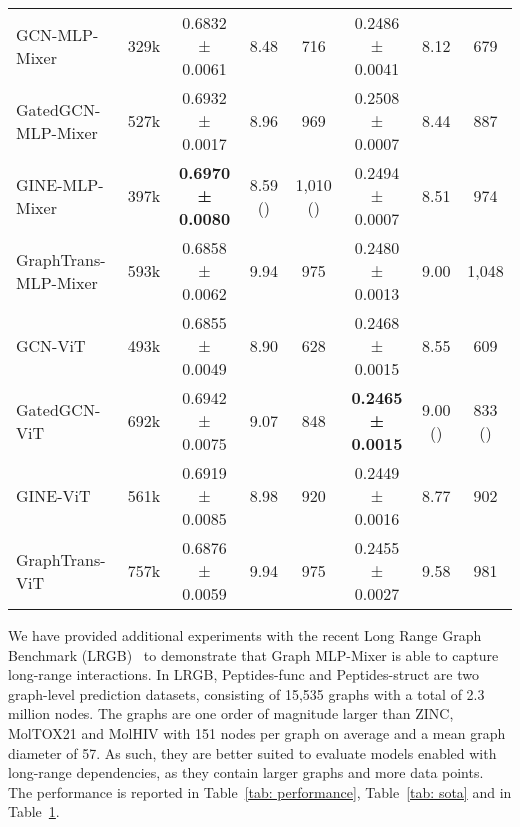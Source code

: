 \documentclass{article}
\begin{document}
\begin{table}[!ht]
\begin{tabular}{lccccccc}
         \midrule
         GCN-MLP-Mixer & {329k}
         & {0.6832 ± 0.0061} & {8.48} & {716}
         & {0.2486 ± 0.0041} & {8.12} & {679} \\
         
         GatedGCN-MLP-Mixer & {527k} 
         & {0.6932 ± 0.0017} & {8.96} & {969}
         & {0.2508 ± 0.0007} & {8.44} & {887} \\
         
         GINE-MLP-Mixer & {397k}
         & \bf{0.6970 ± 0.0080} & {8.59} () & {1,010} ()
         & {0.2494 ± 0.0007} & {8.51} & {974} \\
         
         GraphTrans-MLP-Mixer & {593k}
         & {0.6858 ± 0.0062} & {9.94} & {975}
         & {0.2480 ± 0.0013} & {9.00} & {1,048}\\

         \midrule
         {GCN-ViT} & {493k}
         & {0.6855 ± 0.0049} & {8.90} & {628 }
         & {0.2468 ± 0.0015} & {8.55} & {609} \\
         
         {GatedGCN-ViT} & {692k} 
         & {0.6942 ± 0.0075} & {9.07} & {848}
         & \bf{0.2465 ± 0.0015} & {9.00} () & {833} ()\\
         
         {GINE-ViT} & {561k}
         & {0.6919 ± 0.0085} & {8.98} & {920} 
         & {0.2449 ± 0.0016} & {8.77} & {902}\\
         
         {GraphTrans-ViT} & {757k}
         & {0.6876 ± 0.0059} & {9.94}  & {975}
         & {0.2455 ± 0.0027} & {9.58} & {981}\\
         \bottomrule 
    \end{tabular}
    \label{app tab: lrgb}
\end{table}

We have provided additional experiments with the recent Long Range Graph Benchmark (LRGB)~\citep{dwivedi2022long} to demonstrate that Graph MLP-Mixer is able to capture long-range interactions. In LRGB, Peptides-func and Peptides-struct are two graph-level prediction datasets, consisting of 15,535 graphs with a total of 2.3 million nodes. The graphs are one order of magnitude larger than ZINC, MolTOX21 and MolHIV with 151 nodes per graph on average and a mean graph diameter of 57. As such, they are better suited to evaluate models enabled with long-range dependencies, as they contain larger graphs and more data points. The performance is reported in Table~\ref{tab: performance}, Table~\ref{tab: sota} and in Table~\ref{app tab: lrgb}. 
\end{document}
